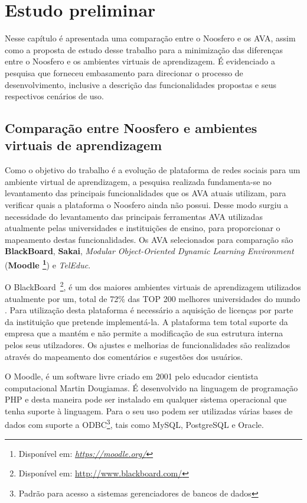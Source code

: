 \chapter{Estudo preliminar}
\label{metodologia}

Nesse capítulo é apresentada uma comparação entre o Noosfero e os AVA, assim como a proposta de estudo desse trabalho para a minimização das diferenças entre o Noosfero e os ambientes virtuais de aprendizagem. É evidenciado a pesquisa que forneceu embasamento para direcionar o processo de desenvolvimento, inclusive a descrição das funcionalidades propostas e seus respectivos cenários de uso.

\section{Comparação entre Noosfero e ambientes virtuais de aprendizagem}
\label{comparacao-ava}

Como o objetivo do trabalho é a evolução de plataforma de redes sociais para um ambiente virtual de aprendizagem, a pesquisa realizada fundamenta-se no levantamento das principais funcionalidades que os AVA atuais utilizam, para verificar quais a plataforma o Noosfero ainda não possui. Desse modo surgiu a necessidade do levantamento das principais ferramentas AVA utilizadas atualmente pelas universidades e instituições de ensino, para proporcionar o mapeamento destas funcionalidades.
%
Os AVA selecionados para comparação são \textbf{BlackBoard}, \textbf{Sakai}, \textit{Modular Object-Oriented Dynamic Learning Environment} (\textbf{Moodle \footnote{Disponível em: \textit{ \url{https://moodle.org/}}}}) e \textit{TelEduc}.

O BlackBoard~\footnote{Disponível em: \url{http://www.blackboard.com/}}, é um dos maiores ambientes virtuais de aprendizagem utilizados atualmente por um, total de 72\% das TOP 200 melhores universidades do mundo \cite{blackboard}. Para utilização desta plataforma é necessário a aquisição de licenças por parte da instituição que pretende implementá-la. A plataforma tem total suporte da empresa que a mantém e não permite a modificação de sua estrutura interna pelos seus utilzadores. Os ajustes e melhorias de funcionalidades são realizados através do mapeamento dos comentários e sugestões dos usuários.

O Moodle, é um software livre criado em 2001 pelo educador cientista computacional Martin Dougiamas. É desenvolvido na linguagem de programação PHP e desta maneira pode ser instalado em qualquer sistema operacional que tenha suporte à linguagem. Para o seu uso podem ser utilizadas várias bases de dados com suporte a ODBC\footnote{Padrão para acesso a sistemas gerenciadores de bancos de dados}, tais como MySQL, PostgreSQL e Oracle.

